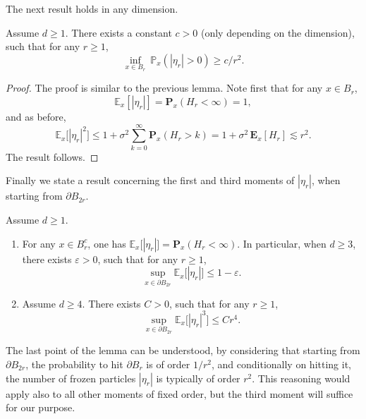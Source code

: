 The next result holds in any dimension.
\begin{lemma}\label{lem.hit.inside}
Assume $d\ge 1$. There exists a constant $c>0$ (only depending on the dimension), such that for any $r\ge 1$,
\[
\inf_{x\in B_r} \ \mathbb P_x(|\eta_r|>0) \ge c/r^2.
\]
\end{lemma}
\begin{proof}
The proof is similar to the previous lemma.
Note first that for any $x\in B_r$,
\[
\mathbb E_x[|\eta_r|] = \mathbf P_x(H_r<\infty) = 1,
\]
and as before,
\[
\mathbb E_x\big[|\eta_r|^2\big] \le 1 + \sigma^2\sum_{k=0}^\infty \mathbf P_x(H_r>k) = 1+ \sigma^2\, \mathbf E_x[H_r] \lesssim r^2.
\]
The result follows.
\end{proof}

Finally we state a result concerning the first and third moments
of $|\eta_r|$, when starting from $\partial B_{2r}$.
\begin{lemma}\label{lem.mom.etar}
Assume $d\ge 1$.
\begin{enumerate}
\item For any $x\in B_r^c$,
one has $\mathbb E_x\big[|\eta_r|\big] = \mathbf P_x(H_r<\infty)$.
In particular, when $d\ge 3$, there exists
$\varepsilon>0$, such that for any $r\ge 1$,
\[
\sup_{x\in \partial B_{2r}} \mathbb E_x\big[|\eta_r|\big]
\le 1-\varepsilon.
\]
\item Assume $d\ge 4$. There exists $C>0$, such that for any $r\ge 1$,
\[
\sup_{x\in \partial B_{2r}} \mathbb E_x\big[|\eta_r|^3\big] \le Cr^4.
\]
\end{enumerate}
\end{lemma}
\begin{remark}
The last point of the lemma can be understood, by considering that starting from $\partial B_{2r}$, the probability to hit $\partial B_r$ is of order $1/r^2$, and conditionally on hitting it, the number of frozen particles $|\eta_r|$ is typically of order $r^2$. This reasoning would apply also
to all other moments of fixed order, but the third moment will suffice for our purpose.
\end{remark}

